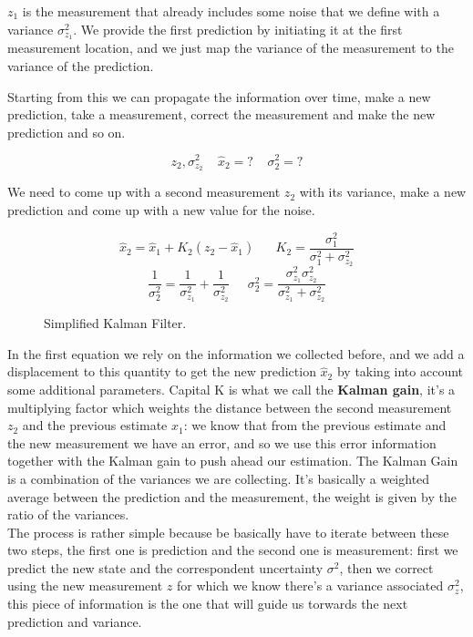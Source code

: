 $z_1$ is the measurement that already includes some noise that we define with a variance $\sigma^2_{z_1}$. We provide the first prediction by initiating it at the first measurement location, and we just map the variance of the measurement to the variance of the prediction.

Starting from this we can propagate the information over time, make a new prediction, take a measurement, correct the measurement and make the new prediction and so on.


\[
    z_2, \sigma^2_{z_2}\;\;\;\;\hat{x}_2=?\;\;\;\;\sigma^2_2=?    
\]

We need to come up with a second measurement $z_2$ with its variance, make a new prediction and come up with a new value for the noise.

\begin{figure}[H]    
\[
    \hat{x}_2 = \hat{x}_1 + K_2(z_2-\hat{x}_1) \;\;\;\;\;\; K_2 = \frac{\sigma^2_1}{\sigma^2_1+\sigma^2_{z_2}}  
\]
\[
    \frac{1}{\sigma^2_2} = \frac{1}{\sigma^2_{z_1}}+\frac{1}{\sigma^2_{z_2}}\;\;\;\;\;
    \sigma^2_2 = \frac{\sigma^2_{z_1}\sigma^2_{z_2}}{\sigma^2_{z_1}+\sigma^2_{z_2}} 
\]
\caption{Simplified Kalman Filter.}
\label{eq:kalman}
\end{figure}
In the first equation we rely on the information we collected before, and we add a displacement to this quantity to get the new prediction $\hat{x}_2$ by taking into account some additional parameters. Capital K is what we call the \textbf{Kalman gain}, it's a multiplying factor which weights the distance between the second measurement $z_2$ and the previous estimate $\hat{x}_1$: we know that from the previous estimate and the new measurement we have an error, and so we use this error information together with the Kalman gain to push ahead our estimation. The Kalman Gain is a combination of the variances we are collecting. It's basically a weighted average between the prediction and the measurement, the weight is given by the ratio of the variances. 
\\

The process is rather simple because be basically have to iterate between these two steps, the first one is prediction and the second one is measurement: first we predict the new state and the correspondent uncertainty $\sigma^2$, then we correct using the new measurement $z$ for which we know there's a variance associated $\sigma^2_z$, this piece of information is the one that will guide us torwards the next prediction and variance.
\\

